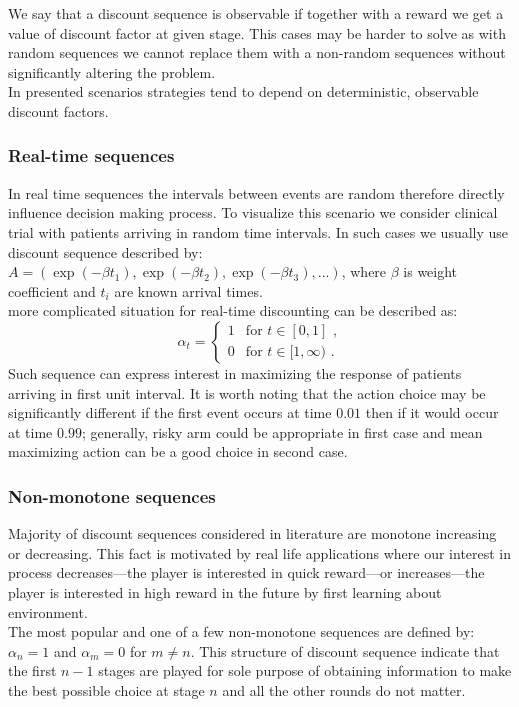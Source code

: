 \documentclass[12pt, a4paper, pdflatex, leqno]{report}
\begin{document}
We say that a discount sequence is observable if together with a reward we get a value of discount factor at given stage. This cases may be harder to solve as with random sequences we cannot replace them with a non-random sequences without significantly altering the problem.\\
In presented scenarios strategies tend to depend on deterministic, observable discount factors.\\

\subsubsection{Real-time sequences}
In real time sequences the intervals between events are random therefore directly influence decision making process. To visualize this scenario we consider clinical trial with patients arriving in random time intervals. In such cases we usually use discount sequence described by: $A = ( \exp(-\beta t_1), \exp(-\beta t_2), \exp(-\beta t_3),... )$, where $\beta$ is weight coefficient and $t_i$ are known arrival times.\\
more complicated situation for real-time discounting can be described as:
$$
  \alpha_t =
    \begin{cases}
      1 & \text{for } t \in [0,1] \text{ ,} \\
      0 & \text{for } t \in [1,\infty) \text{ .}
    \end{cases}
$$
Such sequence can express interest in maximizing the response of patients arriving in first unit interval. It is worth noting that the action choice may be significantly different if the first event occurs at time $0.01$ then if it would occur at time $0.99$; generally, risky arm could be appropriate in first case and mean maximizing action can be a good choice in second case.\\

\subsubsection{Non-monotone sequences}
Majority of discount sequences considered in literature are monotone increasing or decreasing. This fact is motivated by real life applications where our interest in process decreases---the player is interested in  quick reward---or increases---the player is interested in high reward in the future by first learning about environment.\\
The most popular and one of a few non-monotone sequences are defined by: $\alpha_n = 1$ and $\alpha_m = 0$ for $m \neq n$. This structure of discount sequence indicate that the first $n-1$ stages are played for sole purpose of obtaining information to make the best possible choice at stage $n$ and all the other rounds do not matter.\\
\end{document}

